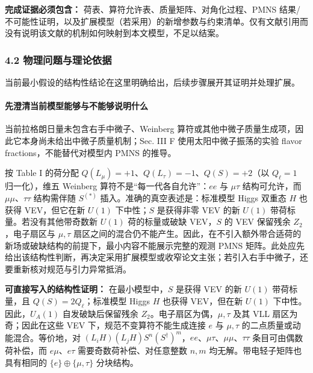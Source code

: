 \documentclass[
]{article}
\begin{document}
\textbf{完成证据必须包含：} 荷表、算符允许表、质量矩阵、对角化过程、PMNS
结果/不可能性证明，以及扩展模型（若采用）的新增参数与约束清单。仅有文献引用而没有说明该文献的机制如何映射到本文模型，不足以结案。

\subsubsection{4.2
物理问题与理论依据}\label{ux7269ux7406ux95eeux9898ux4e0eux7406ux8bbaux4f9dux636e-2}

当前最小假设的结构性结论在这里明确给出，后续步骤展开其证明并处理扩展。

\paragraph{先澄清当前模型能够与不能够说明什么}\label{ux5148ux6f84ux6e05ux5f53ux524dux6a21ux578bux80fdux591fux4e0eux4e0dux80fdux591fux8bf4ux660eux4ec0ux4e48}

当前拉格朗日量未包含右手中微子、Weinberg
算符或其他中微子质量生成项，因此它本身尚未给出中微子质量机制；Sec. III F
使用太阳中微子振荡的实验 flavor fractions，不能替代对模型内 PMNS
的推导。

按 Table I 的荷分配 \(Q(L_\mu)=+1\)、\(Q(L_\tau)=-1\)、\(Q(S)=+2\)（以
\(Q_\ell=1\) 归一化），维五 Weinberg 算符不是``每一代各自允许''：\(ee\)
与 \(\mu\tau\) 结构可允许，而 \(\mu\mu\)、\(\tau\tau\) 结构需伴随
\(S^{(*)}\) 插入。准确的真空表述是：标准模型 Higgs 双重态 \(H\) 也获得
VEV，但它在新 \(U(1)\) 下中性；\(S\) 是获得非零 VEV 的新 \(U(1)\)
带荷标量。若没有其他带奇数新 \(U(1)\) 荷的标量或破缺 VEV，\(S\) 的 VEV
保留残余 \(Z_2\)，电子扇区与 \(\mu,\tau\)
扇区之间的混合仍不能产生。因此，在不引入额外带合适荷的新场或破缺结构的前提下，最小内容不能展示完整的观测
PMNS
矩阵。此处应先给出该结构性判断，再决定采用扩展模型或收窄论文主张；若引入右手中微子，还要重新核对规范与引力异常抵消。

\textbf{可直接写入的结构性证明：} 在最小模型中，\(S\) 是获得 VEV 的新
\(U(1)\) 带荷标量，且 \(Q(S)=2Q_\ell\)；标准模型 Higgs \(H\) 也获得
VEV，但在新 \(U(1)\) 下中性。因此，\(U_A(1)\) 自发破缺后保留残余
\(Z_2\)。电子扇区为偶，\(\mu,\tau\) 及其 VLL 扇区为奇；因此在这些 VEV
下，规范不变算符不能生成连接 \(e\) 与 \(\mu,\tau\)
的二点质量或动能混合。等价地，对
\((L_iH)(L_jH)S^n(S^\dagger)^m\)，\(ee\)、\(\mu\tau\)、\(\mu\mu\)、\(\tau\tau\)
条目可由偶数荷补偿，而 \(e\mu\)、\(e\tau\) 需要奇数荷补偿、对任意整数
\(n,m\) 均无解。带电轻子矩阵也具有相同的 \(\{e\}\oplus\{\mu,\tau\}\)
分块结构。
\end{document}
